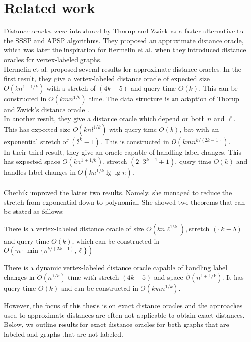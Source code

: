 \section{Related work}\label{survey}
Distance oracles were introduced by Thorup and Zwick \cite{thorup2005approximate} as a
faster alternative to the SSSP and APSP algorithms. They proposed an approximate distance
oracle, which was later the inspiration for Hermelin et al. when they introduced distance
oracles for vertex-labeled graphs. \\
Hermelin et al. \cite{hermelin2011distance} proposed several results for approximate
distance oracles. In the first result, they give a vertex-labeled distance oracle of
expected size $O(kn^{1+1/k})$ with a stretch of $(4k-5)$ and query time $O(k)$. This can
be constructed in $O(kmn^{1/k})$ time. The data structure is an adaption of Thorup and
Zwick's distance oracle \cite{thorup2005approximate}. \\
In another result, they give a distance oracle which depend on both $n$ and $\ell$. This has
expected size $O(knl^{1/k})$ with query time $O(k)$, but with an exponential stretch of
$(2^k-1)$. This is constructed in $O(kmn^{k/(2k-1)})$. \\
In their third result, they give an oracle capable of handling label changes. This has
expected space $O(kn^{1+1/k})$, stretch $(2\cdot3^{k-1}+1)$, query time $O(k)$ and
handles label changes in $O(kn^{1/k}\lg \lg n)$. \\
\\
Chechik \cite{chechik2012improved} improved the latter two results. Namely, she managed to
reduce the stretch from exponential down to polynomial. She showed two theorems that can
be stated as follows:
\begin{thm}\label{chech1}
  There is a vertex-labeled distance oracle
of size $O(kn\ell^{1/k})$, stretch $(4k-5)$  and query time $O(k)$, which can be
constructed in $O(m\cdot \min\{n^{k/(2k-1)}, \ell\})$.
\end{thm}
\begin{thm}\label{chech2}
  There is a dynamic vertex-labeled distance oracle capable of handling label changes in
$\tilde{O}(n^{1/k})$ time with stretch $(4k-5)$ and space $\tilde{O}(n^{1+1/k})$. It has
query time $O(k)$ and can be constructed in $O(kmn^{1/k})$.
\end{thm}
\noindent
However, the focus of this thesis is on exact distance oracles and the approaches used to
approximate distances are often not applicable to obtain exact distances. Below, we outline results for exact distance oracles for both graphs that are labeled and
graphs that are not labeled.

